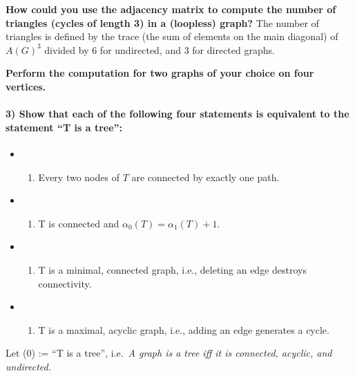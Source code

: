 \documentclass[
]{article}
\providecommand{\tightlist}{%
  \setlength{\itemsep}{0pt}\setlength{\parskip}{0pt}}
\begin{document}
\textbf{How could you use the adjacency matrix to compute the number of
triangles (cycles of length 3) in a (loopless) graph?} The number of
triangles is defined by the trace (the sum of elements on the main
diagonal) of \(A(G)^3\) divided by 6 for undirected, and 3 for directed
graphs.

\textbf{Perform the computation for two graphs of your choice on four
vertices.}

\hypertarget{show-that-each-of-the-following-four-statements-is-equivalent-to-the-statement-t-is-a-tree}{%
\paragraph{3) Show that each of the following four statements is
equivalent to the statement ``T is a
tree'':}\label{show-that-each-of-the-following-four-statements-is-equivalent-to-the-statement-t-is-a-tree}}

\begin{itemize}
\item
  \begin{enumerate}
  \def\labelenumi{(\arabic{enumi})}
  \tightlist
  \item
    Every two nodes of \(T\) are connected by exactly one path.
  \end{enumerate}
\item
  \begin{enumerate}
  \def\labelenumi{(\arabic{enumi})}
  \setcounter{enumi}{1}
  \tightlist
  \item
    T is connected and \(\alpha_0(T) = \alpha_1(T) + 1\).
  \end{enumerate}
\item
  \begin{enumerate}
  \def\labelenumi{(\arabic{enumi})}
  \setcounter{enumi}{2}
  \tightlist
  \item
    T is a minimal, connected graph, i.e., deleting an edge destroys
    connectivity.
  \end{enumerate}
\item
  \begin{enumerate}
  \def\labelenumi{(\arabic{enumi})}
  \setcounter{enumi}{3}
  \tightlist
  \item
    T is a maximal, acyclic graph, i.e., adding an edge generates a
    cycle.
  \end{enumerate}
\end{itemize}

Let (0) := ``T is a tree'', i.e.~\emph{A graph is a tree iff it is
connected, acyclic, and undirected.}
\end{document}
